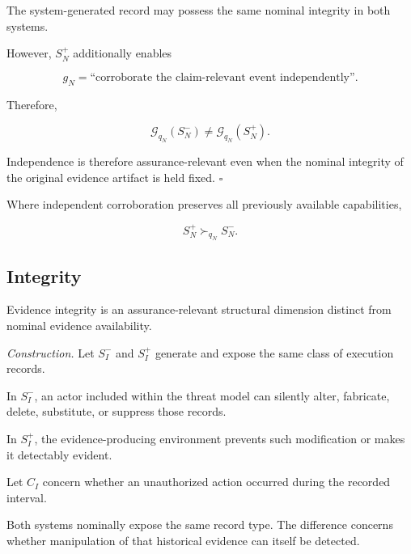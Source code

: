 The system-generated record may possess the same nominal integrity in both systems.

However, \(S_N^{+}\) additionally enables

\begin{equation}
  g_N
  =
  \text{``corroborate the claim-relevant event independently''}.
\end{equation}

Therefore,

\begin{equation}
  \mathcal{G}_{q_N}(S_N^{-})
  \neq
  \mathcal{G}_{q_N}(S_N^{+}).
\end{equation}

Independence is therefore assurance-relevant even when the nominal integrity of the original evidence artifact is held fixed.
\hfill\(\square\)

Where independent corroboration preserves all previously available capabilities,

\begin{equation}
  S_N^{+}
  \succ_{q_N}
  S_N^{-}.
\end{equation}

\subsection{Integrity}
\label{aa.subsec.integrity-contribution}

\begin{proposition}
  \label{se320.prop.EvidenceIntegrityContribution}
  Evidence integrity is an assurance-relevant structural dimension
  distinct from nominal evidence availability.
\end{proposition}

\textit{Construction.}
Let \(S_I^{-}\) and \(S_I^{+}\) generate and expose the same class of execution records.

In \(S_I^{-}\), an actor included within the threat model can silently alter, fabricate, delete, substitute, or suppress those records.

In \(S_I^{+}\), the evidence-producing environment prevents such modification or makes it detectably evident.

Let \(C_I\) concern whether an unauthorized action occurred during the recorded interval.

Both systems nominally expose the same record type.
The difference concerns whether manipulation of that historical evidence can itself be detected.

